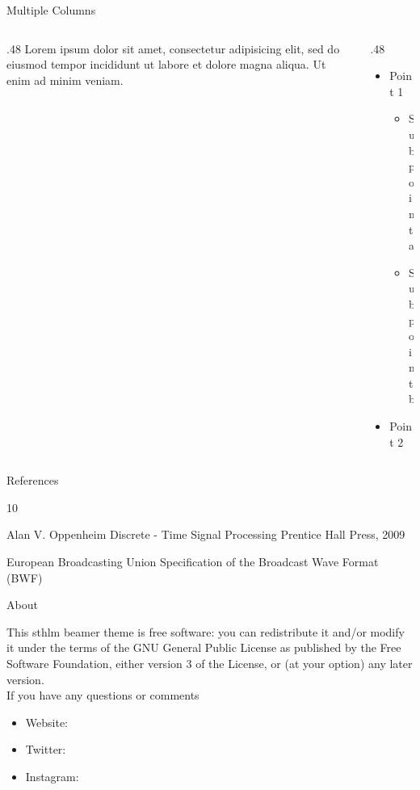 \documentclass[newPxFont,numfooter,sectionpages]{beamer}
\begin{document}

\begin{frame}{Multiple Columns}
\begin{columns}
\begin{column}{.48\linewidth}
		Lorem ipsum dolor sit amet, consectetur adipisicing elit, sed do eiusmod
		tempor incididunt ut labore et dolore magna aliqua. Ut enim ad minim veniam.
\end{column}
\begin{column}{.48\linewidth}
		\begin{itemize}
        	\item Point 1
			\begin{itemize}
				\item Sub point a
				\item Sub point b
			\end{itemize}
        	\item Point 2
		\end{itemize}
	\end{column}
	\end{columns}
\end{frame}

\begin{frame}{References}
	\begin{thebibliography}{10}

	\beamertemplatebookbibitems
	Alan V. Oppenheim
	\newblock Discrete - Time Signal Processing
	\newblock Prentice Hall Press, 2009

	\beamertemplatearticlebibitems
	European Broadcasting Union
	\newblock Specification of the Broadcast Wave Format (BWF)

  \end{thebibliography}
\end{frame}

%
%

\begin{frame}{About}

This sthlm beamer theme is free software: you can redistribute it and/or modify
it under the terms of the GNU General Public License as published by
the Free Software Foundation, either version 3 of the License, or
(at your option) any later version.\\
\vspace{1cm}
If you have any questions or comments
\begin{itemize}
	\item Website: 
	\item Twitter: 
	\item Instagram: 
\end{itemize}
\end{frame}

\begingroup
{}
\begin{frame}[plain]


\end{frame}
\endgroup
\end{document}

